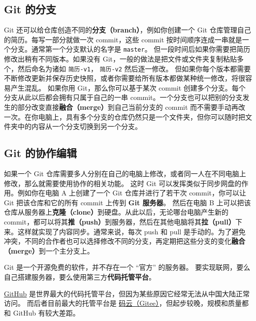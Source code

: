 \subsection{Git 的分支}
Git 还可以给仓库创造不同的\textbf{分支（branch）}，例如你创建一个 Git 仓库管理自己的简历。每写一部分就做一次 commit，这些 commit 按时间顺序连成一串就是一个分支。通常第一个分支默认的名字是 \verb`master`。 但一段时间后如果你需要把简历修改出稍有不同版本。如果没有 Git，一般的做法是把文件或文件夹复制粘贴多个，然后命名为诸如 \verb`简历-v1`， \verb`简历-v2` 然后逐一修改。 但如果你每个版本都需要不断修改更新并保存历史快照，或者你需要给所有版本都做某种统一修改，将很容易产生混乱。 如果你用 Git，那么你可以基于某次 commit 创建多个分支。每个分支从此以后都会拥有只属于自己的一串 commit。一个分支也可以把别的分支发生的部分改变直接\textbf{融合（merge）}到自己当前分支的 commit 而不需要手动再改一次。在你电脑上，具有多个分支的仓库仍然只是一个文件夹，但你可以随时把文件夹中的内容从一个分支切换到另一个分支。

\subsection{Git 的协作编辑}
如果一个 Git 仓库需要多人分别在自己的电脑上修改，或者同一人在不同电脑上修改，那么就需要使用协作的相关功能。 这时 Git 可以发挥类似于同步网盘的作用。例如你在电脑 A 上创建了一个 Git 仓库并进行了若干次 commit，你可以让 Git 把该仓库和它的所有 commit 上传到 \textbf{Git 服务器}。 然后在电脑 B 上可以把该仓库从服务器上\textbf{克隆（clone）}到硬盘。从此以后，无论哪台电脑产生新的 commit，都可以将其\textbf{推（push）}到服务器，然后在其他电脑将其\textbf{拉（pull）}下来。这样就实现了内容同步。通常来说，每次 push 和 pull 是手动的。为了避免冲突，不同的合作者也可以选择修改不同的分支，再定期把这些分支的变化\textbf{融合（merge）}到一个主分支上。

Git 是一个开源免费的软件，并不存在一个 “官方” 的服务器。 要实现联网，要么自己搭建服务器，要么使用第三方\textbf{代码托管平台}。

\href{https://github.com/}{GitHub} 是世界最大的代码托管平台，但因为某些原因它经常无法从中国大陆正常访问。 而后者目前最大的托管平台是 \href{https://gitee.com/}{码云（Gitee）}，但起步较晚，规模和质量都和 GitHub 有较大差距。


